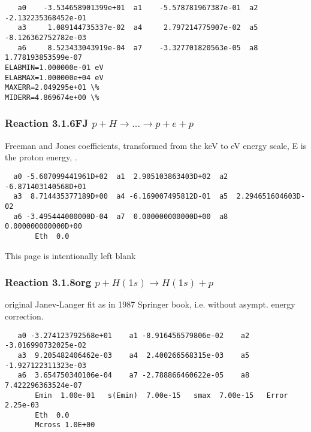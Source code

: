\documentclass[12pt,dvipdfmx]{article}
\begin{document}
\begin{small}\begin{verbatim}
   a0    -3.534658901399e+01  a1    -5.578781967387e-01  a2    -2.132235368452e-01
   a3     1.089144735337e-02  a4     2.797214775907e-02  a5    -8.126362752782e-03
   a6     8.523433043919e-04  a7    -3.327701820563e-05  a8     1.778193853599e-07
ELABMIN=1.000000e-01 eV
ELABMAX=1.000000e+04 eV
MAXERR=2.049295e+01 \%
MIDERR=4.869674e+00 \%
\end{verbatim}\end{small}

\newpage

\subsubsection{
Reaction 3.1.6FJ
$ p + H \rightarrow . . . \rightarrow p + e + p $ }

Freeman and Jones coefficients, transformed from the keV to eV energy scale,
E is the proton energy, \cite{kn:Freeman}.

\begin{small}\begin{verbatim}
  a0 -5.607099441961D+02  a1  2.905103863403D+02  a2 -6.871403140568D+01
  a3  8.714435377189D+00  a4 -6.169007495812D-01  a5  2.294651604603D-02
  a6 -3.495444000000D-04  a7  0.000000000000D+00  a8  0.000000000000D+00
       Eth  0.0
\end{verbatim}\end{small}
\newpage
This page is intentionally left blank
\newpage

\subsubsection{
Reaction 3.1.8org $  p + H(1s) \rightarrow H(1s) + p  $
}
original Janev-Langer fit as in 1987 Springer book, i.e. without asympt. energy correction.


\begin{small}\begin{verbatim}
   a0 -3.274123792568e+01    a1 -8.916456579806e-02    a2 -3.016990732025e-02
   a3  9.205482406462e-03    a4  2.400266568315e-03    a5 -1.927122311323e-03
   a6  3.654750340106e-04    a7 -2.788866460622e-05    a8  7.422296363524e-07
       Emin  1.00e-01   s(Emin)  7.00e-15   smax  7.00e-15   Error  2.25e-03
       Eth  0.0
       Mcross 1.0E+00
\end{verbatim}\end{small}
\end{document}
